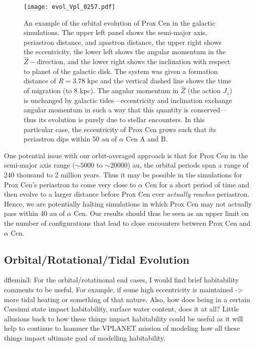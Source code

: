 \documentclass[preprint,12pt]{aastex}
\newcommand{\xxx}[1]{{\color{red} #1}} %
\begin{document}
\begin{figure}
\texttt{[image: evol\_Vpl\_0257.pdf]}
\caption{An example of the orbital evolution of Prox Cen in the galactic 
  simulations. The upper left panel shows the semi-major axis, periastron 
  distance, and apastron distance, the upper right shows the eccentricity, 
  the lower left shows the angular momentum in the $\hat{Z}-$direction, 
  and the lower right shows the inclination with respect to planet of the 
  galactic disk. The system was given a formation distance of $R = 3.78$ 
  kpc and the vertical dashed line shows the time of migration (to 8 kpc). 
  The angular momentum in $\hat{Z}$ (the action $J_z$) is unchanged by 
  galactic tides---eccentricity and inclination exchange angular momentum 
  in such a way that this quantity is conserved---thus its evolution is purely 
  due to stellar encounters. In this particular case, the eccentricity of Prox Cen 
  grows such that its periastron dips within 50 au of $\alpha$ Cen A and B.}
\label{fig:galevolution}
\end{figure}

One potential issue with our orbit-averaged approach is that for Prox Cen in the 
semi-major axis range ($\sim5000$ to $\sim20000$) au, the orbital periods 
span a range of 240 thousand to 2 million years. Thus it may be possible in 
the simulations for Prox Cen's periastron to come very close to $\alpha$ Cen 
for a short period of time and then evolve to a larger distance before Prox Cen 
ever \emph{actually reaches} periastron. Hence, we are potentially halting 
simulations in which 
Prox Cen may not actually pass within 40 au of $\alpha$ Cen. Our results 
should thus be seen as an upper limit on the number of configurations 
that lead to close encounters between Prox Cen and $\alpha$ Cen.
 
\subsection{Orbital/Rotational/Tidal Evolution}
\label{sec:results:orbital}

\xxx{dflemin3: For the orbital/rotatinonal end cases, I would find brief habitability comments to be useful.  For example,
if some high eccentricity is maintained -> more tidal heating or something of that nature.  Also, how does being in a certain
Cassinni state impact habitability, surface water content, does it at all?  Little allusions back to how these things impact
habitability could be useful as it will help to continue to hammer the VPLANET mission of modeling how all these things
impact ultimate goal of modelling habitability.}
\end{document}

